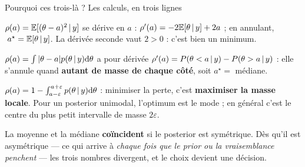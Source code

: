 \begin{frame}{Pourquoi ces trois-là ? Les calculs, en trois lignes}
\small
\vspace{-1.5mm}
\begin{ebox}
$\rho(a)=\mathbb{E}[(\theta-a)^2 \,\vert\, y]$ se dérive en $a$ :
$\rho'(a) = -2\mathbb{E}[\theta \,\vert\, y] + 2a$ ; en annulant, $\;a^\star = \mathbb{E}[\theta \,\vert\, y]$.
La dérivée seconde vaut $2 > 0$ : c'est bien un minimum.
\end{ebox}
\vspace{1mm}
\begin{ebox}
$\rho(a)=\int |\theta-a| p(\theta \,\vert\, y)\mathrm{d}\theta$ a pour dérivée
$\rho'(a) = P(\theta < a \,\vert\, y) - P(\theta > a \,\vert\, y)$ : elle s'annule
quand \textbf{autant de masse de chaque côté}, soit $a^\star = $ médiane.
\end{ebox}
\vspace{1mm}
\begin{ebox}
$\rho(a) = 1 - \int_{a-\varepsilon}^{a+\varepsilon} p(\theta \,\vert\, y)\mathrm{d}\theta$ :
minimiser la perte, c'est \textbf{maximiser la masse locale}. Pour un posterior
unimodal, l'optimum est le mode ; en général c'est le centre du plus petit
intervalle de masse $2\varepsilon$.
\end{ebox}
\vspace{1mm}
\begin{kbox}
La moyenne et la médiane \textbf{coïncident} si le posterior est symétrique.
Dès qu'il est asymétrique --- ce qui arrive à \emph{chaque fois que le prior ou la
vraisemblance penchent} --- les trois nombres divergent, et le choix devient une
décision.
\end{kbox}
\end{frame}

